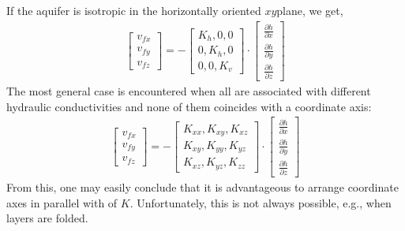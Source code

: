 \documentclass[letterpaper,10pt,english]{sphinxmanual}
\begin{document}
If the aquifer is isotropic in the horizontally oriented \(xy\)\sphinxhyphen{}plane, we get,
\begin{equation*}
\begin{split}
\begin{bmatrix}
v_{fx}\\ v_{fy}\\ v_{fz}
\end{bmatrix}
= -\begin{bmatrix}
K_h, 0,  0 \\
0, K_h, 0\\
0, 0, K_v
\end{bmatrix}
\cdot
\begin{bmatrix}
\frac{\partial h}{\partial x}\\ \frac{\partial h}{\partial y} \\ \frac{\partial h}{\partial z}
\end{bmatrix}
\end{split}
\end{equation*}
The most general case is encountered when all  are associated with different hydraulic conductivities and none of them coincides with a coordinate axis:
\begin{equation*}
\begin{split}
\begin{bmatrix}
v_{fx}\\ v_{fy}\\ v_{fz}
\end{bmatrix}
= -\begin{bmatrix}
K_{xx}, K_{xy},  K_{xz} \\
K_{xy}, K_{yy}, K_{yz}\\
K_{xz}, K_{yz}, K_{zz}
\end{bmatrix}
\cdot
\begin{bmatrix}
\frac{\partial h}{\partial x}\\ \frac{\partial h}{\partial y} \\ \frac{\partial h}{\partial z}
\end{bmatrix}
\end{split}
\end{equation*}
From this, one may easily conclude that it is advantageous to arrange coordinate axes in parallel with  of \(K\). Unfortunately, this is not always possible, e.g., when layers are folded.
\end{document}
